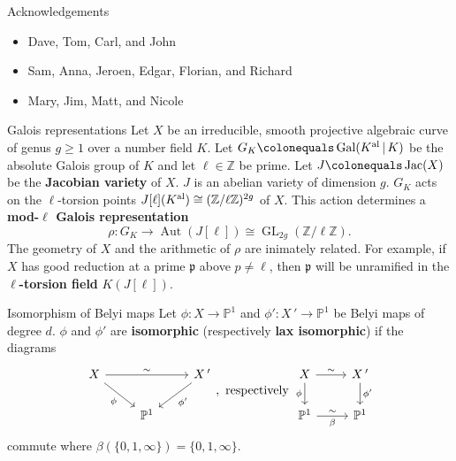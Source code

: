 \documentclass[xcolor=dvipsnames]{beamer}
\theoremstyle{plain}
\newcommand{\PP}{\mathbb P}
\newcommand{\ZZ}{\mathbb Z}
\newcommand{\Kal}{{{K}^{\textup{al}}}}
\DeclareMathOperator{\Aut}{Aut}
\DeclareMathOperator{\Gal}{Gal}
\DeclareMathOperator{\GL}{GL}
\DeclareMathOperator{\Jac}{Jac}
\begin{document}
  \begin{frame}{Acknowledgements}
    \begin{itemize}
      \item
        Dave, Tom, Carl, and John
      \item
        Sam, Anna, Jeroen, Edgar, Florian, and Richard
      \item
        Mary, Jim, Matt, and Nicole
    \end{itemize}
  \end{frame}
  \appendix
  \begin{frame}{Galois representations}
    Let $X$ be an irreducible, smooth
    projective algebraic curve of genus $g\geq 1$
    over a number field $K$.
    Let $G_K\colonequals\Gal(\Kal\,|\,K)$ be
    the absolute Galois group of $K$ and
    let $\ell\in\ZZ$ be prime.
    \newline
    Let $J\colonequals\Jac(X)$ be the
    \textbf{Jacobian variety} of $X$.
    $J$ is an abelian variety of dimension $g$.
    \newline
    $G_K$ acts on the $\ell$-torsion points
    $J[\ell](\Kal)\cong(\ZZ/\ell\ZZ)^{2g}$ of $X$.
    \newline
    This action determines a
    \textbf{mod-$\ell$ Galois representation}
    \[
      \rho\colon G_K\to\Aut(J[\ell])\cong\GL_{2g}(\ZZ/\ell\ZZ).
    \]
    The geometry of $X$ and the arithmetic of
    $\rho$ are inimately related.
    For example,
    if $X$ has good reduction at a prime
    $\mathfrak{p}$ above
    $p\neq\ell$,
    then $\mathfrak{p}$
    will be unramified in the
    \textbf{$\ell$-torsion field}
    $K(J[\ell])$.
  \end{frame}
  \begin{frame}[fragile]{Isomorphism of Belyi maps}
    Let $\phi\colon X\to\PP^1$
    and
    $\phi'\colon X\,'\to\PP^1$
    be Belyi maps of degree $d$.
    \newline
    $\phi$ and $\phi'$ are
    \textbf{isomorphic}
    (respectively \textbf{lax isomorphic})
    if the diagrams
    \[
      \begin{tikzcd}
        X\arrow{rr}{\sim}\arrow{dr}[swap]{\phi}
        &
        &X\,'\arrow{dl}{\phi'}\\
        &\PP^1
      \end{tikzcd},
      \text{ respectively }
      \begin{tikzcd}
        X\arrow{r}{\sim}\arrow{d}[swap]{\phi}&X\,'\arrow{d}{\phi'}\\
        \PP^1\arrow{r}{\sim}[swap]{\beta}&\PP^1
      \end{tikzcd}
    \]
    commute
    where $\beta(\{0,1,\infty\}) = \{0,1,\infty\}$.
  \end{frame}
\end{document}
